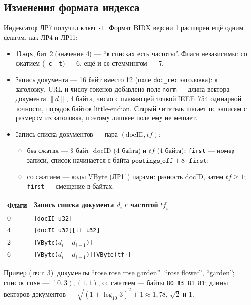 \subsection{Изменения формата индекса}
Индексатор ЛР7 получил ключ \texttt{-t}. Формат BIDX версии 1 расширен ещё одним флагом, как ЛР4 и ЛР11:
\begin{itemize}
    \item \texttt{flags}, бит 2 (значение 4) --- \enquote{в списках есть частоты}. Флаги независимы: со сжатием (\texttt{-c -t}) --- 6, ещё и со стеммингом --- 7.
    \item Запись документа --- 16 байт вместо 12 (поле \texttt{doc\_rec} заголовка): к заголовку, URL и числу токенов добавлено поле \texttt{norm} --- длина вектора документа $\|d\|$, 4 байта, число с плавающей точкой IEEE~754 одинарной точности, порядок байтов little-endian. Старый читатель шагает по записям с размером из заголовка, поэтому лишнее поле ему не мешает.
    \item Запись списка документов --- пара $(\mathrm{docID}, \mathit{tf})$:
    \begin{itemize}
        \item без сжатия --- 8 байт: docID (4 байта) и $\mathit{tf}$ (4 байта); \texttt{first} --- номер записи, список начинается с байта $\texttt{postings\_off} + 8 \cdot \texttt{first}$;
        \item со сжатием --- коды VByte (ЛР11) парами: разность docID, затем $\mathit{tf} \ge 1$; \texttt{first} --- смещение в байтах.
    \end{itemize}
\end{itemize}
\begin{center}
\small
\begin{tabular}{|l|l|}
\hline
Флаги & Запись списка документа $d_i$ с частотой $\mathit{tf}_i$ \\
\hline
0 & \texttt{[docID u32]} \\
4 & \texttt{[docID u32][tf u32]} \\
2 & \texttt{[VByte($d_i - d_{i-1}$)]} \\
6 & \texttt{[VByte($d_i - d_{i-1}$)][VByte(tf)]} \\
\hline
\end{tabular}
\end{center}
Пример (тест~3): документы \enquote{rose rose rose garden}, \enquote{rose flower}, \enquote{garden}; список \texttt{rose} --- $(0, 3), (1, 1)$, со сжатием --- байты \texttt{80 83 81 81}; длины векторов документов --- $\sqrt{(1 + \log_{10} 3)^2 + 1} \approx 1{,}78$, $\sqrt{2}$ и 1.

